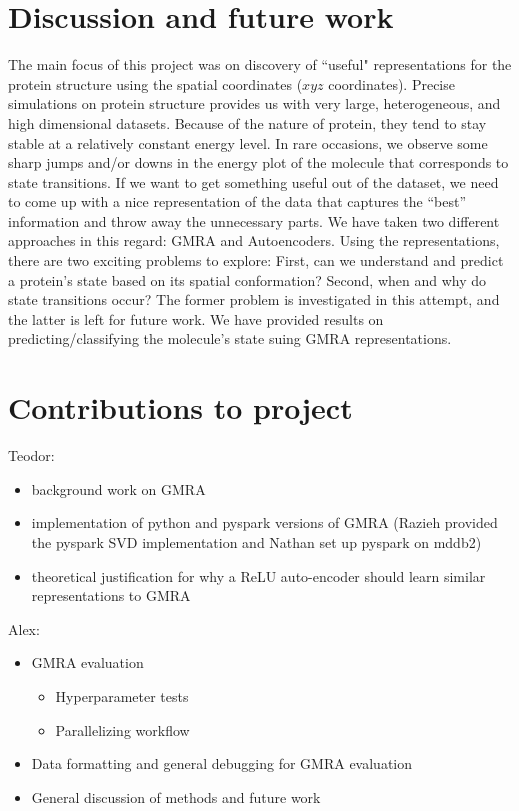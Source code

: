 \documentclass{article}
\begin{document}
	\section{Discussion and future work}
	The main focus of this project was on discovery of ``useful" representations for the protein structure using the spatial coordinates ($xyz$ coordinates). Precise simulations on protein structure provides us with very large, heterogeneous, and high dimensional datasets. Because of the nature of protein, they tend to stay stable at a relatively constant energy level. In rare occasions, we observe some sharp jumps and/or downs in the energy plot of the molecule that corresponds to state transitions. If we want to get something useful out of the dataset, we need to come up with a nice representation of the data that captures the ``best'' information and throw away the unnecessary parts. We have taken two different approaches in this regard: GMRA and Autoencoders. Using the representations, there are two exciting problems to explore: First, can we understand and predict a protein's state based on its spatial conformation? Second, when and why do state transitions occur? The former problem is investigated in this attempt, and the latter is left for future work. We have provided results on predicting/classifying the molecule's state suing GMRA representations. 
	
	\section{Contributions to project}
	Teodor:
	\begin{itemize}
		\item background work on GMRA
		\item implementation of python and pyspark versions of GMRA (Razieh provided the pyspark SVD implementation and Nathan set up pyspark on mddb2)
		\item theoretical justification for why a ReLU auto-encoder should learn similar representations to GMRA
	\end{itemize}
	
	Alex:
	\begin{itemize}
		\item GMRA evaluation
		\begin{itemize}
			\item Hyperparameter tests
			\item Parallelizing workflow
		\end{itemize}
		\item Data formatting and general debugging for GMRA evaluation
		\item General discussion of methods and future work
	\end{itemize}
	
\end{document}
